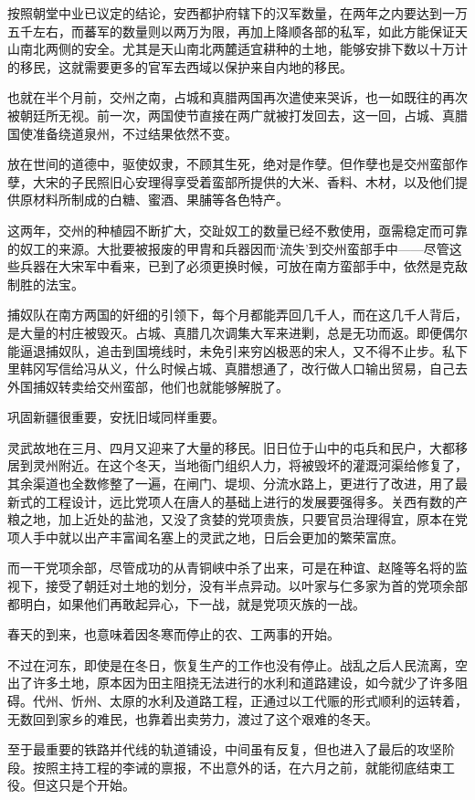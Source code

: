 按照朝堂中业已议定的结论，安西都护府辖下的汉军数量，在两年之内要达到一万五千左右，而蕃军的数量则以两万为限，再加上降顺各部的私军，如此方能保证天山南北两侧的安全。尤其是天山南北两麓适宜耕种的土地，能够安排下数以十万计的移民，这就需要更多的官军去西域以保护来自内地的移民。

也就在半个月前，交州之南，占城和真腊两国再次遣使来哭诉，也一如既往的再次被朝廷所无视。前一次，两国使节直接在两广就被打发回去，这一回，占城、真腊国使准备绕道泉州，不过结果依然不变。

放在世间的道德中，驱使奴隶，不顾其生死，绝对是作孽。但作孽也是交州蛮部作孽，大宋的子民照旧心安理得享受着蛮部所提供的大米、香料、木材，以及他们提供原材料所制成的白糖、蜜酒、果脯等各色特产。

这两年，交州的种植园不断扩大，交趾奴工的数量已经不敷使用，亟需稳定而可靠的奴工的来源。大批要被报废的甲胄和兵器因而‘流失’到交州蛮部手中——尽管这些兵器在大宋军中看来，已到了必须更换时候，可放在南方蛮部手中，依然是克敌制胜的法宝。

捕奴队在南方两国的奸细的引领下，每个月都能弄回几千人，而在这几千人背后，是大量的村庄被毁灭。占城、真腊几次调集大军来进剿，总是无功而返。即便偶尔能逼退捕奴队，追击到国境线时，未免引来穷凶极恶的宋人，又不得不止步。私下里韩冈写信给冯从义，什么时候占城、真腊想通了，改行做人口输出贸易，自己去外国捕奴转卖给交州蛮部，他们也就能够解脱了。

巩固新疆很重要，安抚旧域同样重要。

灵武故地在三月、四月又迎来了大量的移民。旧日位于山中的屯兵和民户，大都移居到灵州附近。在这个冬天，当地衙门组织人力，将被毁坏的灌溉河渠给修复了，其余渠道也全数修整了一遍，在闸门、堤坝、分流水路上，更进行了改进，用了最新式的工程设计，远比党项人在唐人的基础上进行的发展要强得多。关西有数的产粮之地，加上近处的盐池，又没了贪婪的党项贵族，只要官员治理得宜，原本在党项人手中就以出产丰富闻名塞上的灵武之地，日后会更加的繁荣富庶。

而一干党项余部，尽管成功的从青铜峡中杀了出来，可是在种谊、赵隆等名将的监视下，接受了朝廷对土地的划分，没有半点异动。以叶家与仁多家为首的党项余部都明白，如果他们再敢起异心，下一战，就是党项灭族的一战。

春天的到来，也意味着因冬寒而停止的农、工两事的开始。

不过在河东，即使是在冬日，恢复生产的工作也没有停止。战乱之后人民流离，空出了许多土地，原本因为田主阻挠无法进行的水利和道路建设，如今就少了许多阻碍。代州、忻州、太原的水利及道路工程，正通过以工代赈的形式顺利的运转着，无数回到家乡的难民，也靠着出卖劳力，渡过了这个艰难的冬天。

至于最重要的铁路并代线的轨道铺设，中间虽有反复，但也进入了最后的攻坚阶段。按照主持工程的李诫的禀报，不出意外的话，在六月之前，就能彻底结束工役。但这只是个开始。

